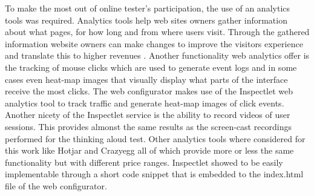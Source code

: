 \documentclass[../medieninformatik-arbeit.tex]{subfiles}
\begin{document}
To make the most out of online tester's participation, the use of an analytics tools was required. Analytics tools help web sites owners gather information about what pages, for how long and from where users visit. Through the gathered information website owners can make changes to improve the visitors experience and translate this to higher revenues \cite{peterson2004web}. Another functionality web analytics offer is the tracking of mouse clicks which are used to generate event logs and in some cases even heat-map images that visually display what parts of the interface receive the most clicks. The web configurator makes use of the Inspectlet web analytics tool \cite{inspectlet} to track traffic and generate heat-map images of click events. Another nicety of the Inspectlet service is the ability to record videos of user sessions. This provides almonst the same results as the screen-cast recordings performed for the thinking aloud test. Other analytics tools where considered for this work like Hotjar \cite{hotjar} and Crazyegg \cite{inspectlet} all of which provide more or less the same functionality but with different price ranges. Inspectlet showed to be easily implementable through a short code snippet that is embedded to the index.html file of the web configurator. 
\end{document}
